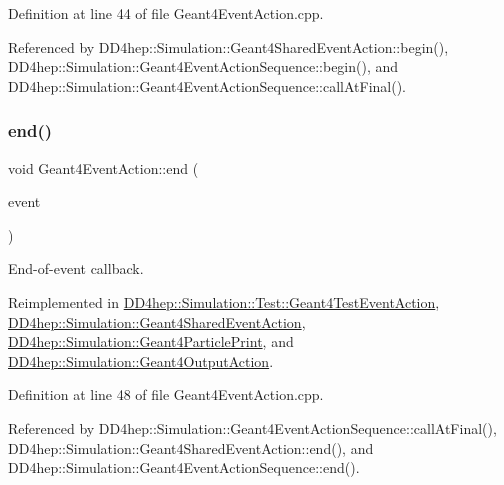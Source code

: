 Definition at line 44 of file Geant4\+Event\+Action.\+cpp.



Referenced by D\+D4hep\+::\+Simulation\+::\+Geant4\+Shared\+Event\+Action\+::begin(), D\+D4hep\+::\+Simulation\+::\+Geant4\+Event\+Action\+Sequence\+::begin(), and D\+D4hep\+::\+Simulation\+::\+Geant4\+Event\+Action\+Sequence\+::call\+At\+Final().

\hypertarget{class_d_d4hep_1_1_simulation_1_1_geant4_event_action_af131bad73c28da3419af7c29e0b8c250}{}\label{class_d_d4hep_1_1_simulation_1_1_geant4_event_action_af131bad73c28da3419af7c29e0b8c250} 
\subsubsection{\texorpdfstring{end()}{end()}}
{\footnotesize\ttfamily void Geant4\+Event\+Action\+::end (\begin{DoxyParamCaption}\item[{const G4\+Event $\ast$}]{event }\end{DoxyParamCaption})\hspace{0.3cm}{\ttfamily [virtual]}}



End-\/of-\/event callback. 



Reimplemented in \hyperlink{class_d_d4hep_1_1_simulation_1_1_test_1_1_geant4_test_event_action_a1b436d5b8c7b3f9fa93bc2b04946cad3}{D\+D4hep\+::\+Simulation\+::\+Test\+::\+Geant4\+Test\+Event\+Action}, \hyperlink{class_d_d4hep_1_1_simulation_1_1_geant4_shared_event_action_a207f1882eece3c87364b38b266bd9935}{D\+D4hep\+::\+Simulation\+::\+Geant4\+Shared\+Event\+Action}, \hyperlink{class_d_d4hep_1_1_simulation_1_1_geant4_particle_print_ad2ba85711f58068667eb94d1f6b80012}{D\+D4hep\+::\+Simulation\+::\+Geant4\+Particle\+Print}, and \hyperlink{class_d_d4hep_1_1_simulation_1_1_geant4_output_action_a6fa4e933973a42a00b7be10292619780}{D\+D4hep\+::\+Simulation\+::\+Geant4\+Output\+Action}.



Definition at line 48 of file Geant4\+Event\+Action.\+cpp.



Referenced by D\+D4hep\+::\+Simulation\+::\+Geant4\+Event\+Action\+Sequence\+::call\+At\+Final(), D\+D4hep\+::\+Simulation\+::\+Geant4\+Shared\+Event\+Action\+::end(), and D\+D4hep\+::\+Simulation\+::\+Geant4\+Event\+Action\+Sequence\+::end().




